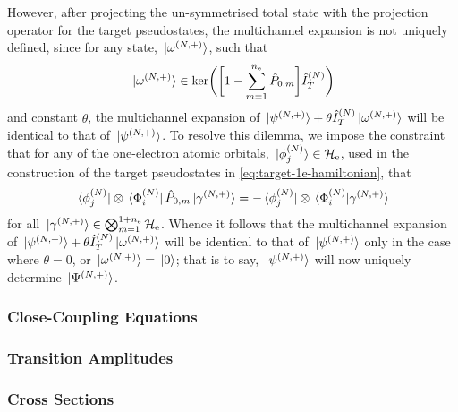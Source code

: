 \documentclass[draft]{article}
\begin{document}
However, after projecting the un-symmetrised total state with the projection
operator for the target pseudostates, the multichannel expansion is not uniquely
defined, since for any state, $\ket*{\omega^{(N, +)}}$, such that
\begin{equation}
  \label{eq:multichannel-kernel}
  \ket*{\omega^{\lr{N, +}}}
  \in
  \ker\lr[\bigg]
  {
    \lrsq[\bigg]
    {
      1 - \sum_{m = 1}^{n_{\mathrm{e}}}\hat{P}_{0, m}
    }
    \hat{I}_{T}^{\lr{N}}
  }
\end{equation}
and constant $\theta$, the multichannel expansion of
$\ket*{\psi^{(N, +)}}
+ \theta \hat{I}_{T}^{(N)} \ket*{\omega^{(N, +)}}$ will be identical to
that of $\ket*{\psi^{(N, +)}}$.
To resolve this dilemma, we impose the constraint that for any of the
one-electron atomic orbitals,
$\ket*{\phi_{j}^{(N)}} \in \mathcal{H}_{\mathrm{e}}$, used in the
construction of the target pseudostates in \autoref{eq:target-1e-hamiltonian},
that
\begin{equation}
  \label{eq:multichannel-constraint}
  \bra*{\phi_{j}^{\lr{N}}}
  \otimes
  \bra*{\Phi_{i}^{\lr{N}}}
  \hat{P}_{0, m}
  \ket*{\gamma^{\lr{N, +}}}
  =
  -
  \bra*{\phi_{j}^{\lr{N}}}
  \otimes
  \bra*{\Phi_{i}^{\lr{N}}}
  \ket*{\gamma^{\lr{N, +}}}
\end{equation}
for all $\ket*{\gamma^{(N, +)}}
\in \bigotimes_{m = 1}^{1 + n_{\mathrm{e}}} \mathcal{H}_{\mathrm{e}}$.
Whence it follows that the multichannel expansion of
$\ket*{\psi^{(N, +)}}
+ \theta \hat{I}_{T}^{(N)} \ket*{\omega^{(N, +)}}$ will be identical to
that of $\ket*{\psi^{(N, +)}}$ only in the case where $\theta = 0$, or
$\ket*{\omega^{(N, +)}} = \ket*{0}$; that is to say,
$\ket*{\psi^{(N, +)}}$ will now uniquely determine $\ket*{\Psi^{(N, +)}}$.

\subsubsection{Close-Coupling Equations}
\label{sec:cc-equations}

\subsubsection{Transition Amplitudes}
\label{sec:transition-amplitudes}

\subsubsection{Cross Sections}
\label{sec:cross-sections}
\end{document}
